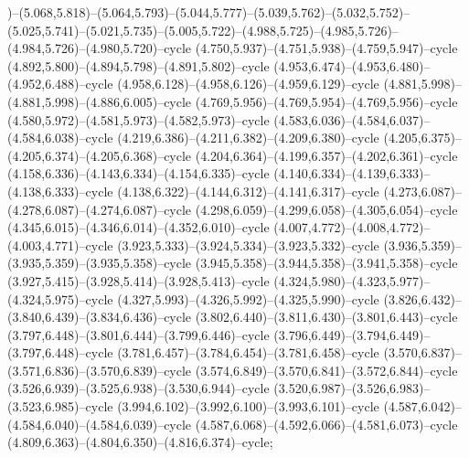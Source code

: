 )--(5.068,5.818)--(5.064,5.793)--(5.044,5.777)--(5.039,5.762)--(5.032,5.752)--(5.025,5.741)--(5.021,5.735)--(5.005,5.722)--(4.988,5.725)--(4.985,5.726)--(4.984,5.726)--(4.980,5.720)--cycle (4.750,5.937)--(4.751,5.938)--(4.759,5.947)--cycle (4.892,5.800)--(4.894,5.798)--(4.891,5.802)--cycle (4.953,6.474)--(4.953,6.480)--(4.952,6.488)--cycle (4.958,6.128)--(4.958,6.126)--(4.959,6.129)--cycle (4.881,5.998)--(4.881,5.998)--(4.886,6.005)--cycle (4.769,5.956)--(4.769,5.954)--(4.769,5.956)--cycle (4.580,5.972)--(4.581,5.973)--(4.582,5.973)--cycle (4.583,6.036)--(4.584,6.037)--(4.584,6.038)--cycle (4.219,6.386)--(4.211,6.382)--(4.209,6.380)--cycle (4.205,6.375)--(4.205,6.374)--(4.205,6.368)--cycle (4.204,6.364)--(4.199,6.357)--(4.202,6.361)--cycle (4.158,6.336)--(4.143,6.334)--(4.154,6.335)--cycle (4.140,6.334)--(4.139,6.333)--(4.138,6.333)--cycle (4.138,6.322)--(4.144,6.312)--(4.141,6.317)--cycle (4.273,6.087)--(4.278,6.087)--(4.274,6.087)--cycle (4.298,6.059)--(4.299,6.058)--(4.305,6.054)--cycle (4.345,6.015)--(4.346,6.014)--(4.352,6.010)--cycle (4.007,4.772)--(4.008,4.772)--(4.003,4.771)--cycle (3.923,5.333)--(3.924,5.334)--(3.923,5.332)--cycle (3.936,5.359)--(3.935,5.359)--(3.935,5.358)--cycle (3.945,5.358)--(3.944,5.358)--(3.941,5.358)--cycle (3.927,5.415)--(3.928,5.414)--(3.928,5.413)--cycle (4.324,5.980)--(4.323,5.977)--(4.324,5.975)--cycle (4.327,5.993)--(4.326,5.992)--(4.325,5.990)--cycle (3.826,6.432)--(3.840,6.439)--(3.834,6.436)--cycle (3.802,6.440)--(3.811,6.430)--(3.801,6.443)--cycle (3.797,6.448)--(3.801,6.444)--(3.799,6.446)--cycle (3.796,6.449)--(3.794,6.449)--(3.797,6.448)--cycle (3.781,6.457)--(3.784,6.454)--(3.781,6.458)--cycle (3.570,6.837)--(3.571,6.836)--(3.570,6.839)--cycle (3.574,6.849)--(3.570,6.841)--(3.572,6.844)--cycle (3.526,6.939)--(3.525,6.938)--(3.530,6.944)--cycle (3.520,6.987)--(3.526,6.983)--(3.523,6.985)--cycle (3.994,6.102)--(3.992,6.100)--(3.993,6.101)--cycle (4.587,6.042)--(4.584,6.040)--(4.584,6.039)--cycle (4.587,6.068)--(4.592,6.066)--(4.581,6.073)--cycle (4.809,6.363)--(4.804,6.350)--(4.816,6.374)--cycle;

